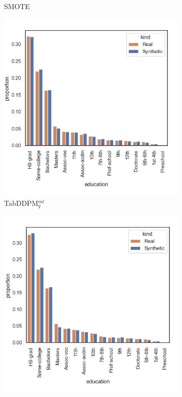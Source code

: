 \begin{figure}[h]
\begin{subfigure}{0.23\textwidth}
		\caption{SMOTE}
	\end{subfigure}
	\begin{subfigure}{0.23\textwidth}
		\centering
		\includegraphics[width=\textwidth]{images/dist_education/tab-ddpm.jpg}
		\caption{TabDDPM$^{ml}_q$}
	\end{subfigure}
	\begin{subfigure}{0.23\textwidth}
		\centering
		\includegraphics[width=\textwidth]{images/dist_education/tab-ddpm-bgm.jpg}

\end{subfigure}
\end{figure}

